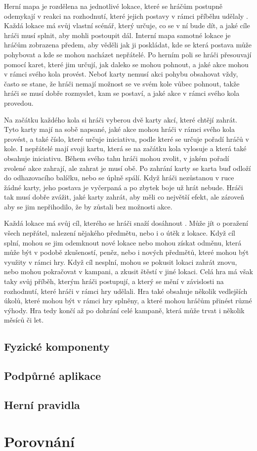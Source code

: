 Herní mapa je rozdělena na jednotlivé lokace, které se hráčům postupně odemykají v reakci na rozhodnutí, které jejich postavy v rámci příběhu udělaly . Každá lokace má svůj vlastní scénář, který určuje, co se v ní bude dít, a jaké cíle hráči musí splnit, aby mohli postoupit dál. Interní mapa samotné lokace je hráčům zobrazena předem, aby věděli jak ji poskládat, kde se která postava může pohybovat a kde se mohou nacházet nepřátelé. Po herním poli se hráči přesouvají pomocí karet, které jim určují, jak daleko se mohou pohnout, a jaké akce mohou v rámci svého kola provést. Neboť karty nemusí akci pohybu obsahovat vždy, často se stane, že hráči nemají možnost se ve svém kole vůbec pohnout, takže hráči se musí dobře rozmyslet, kam se postaví, a jaké akce v rámci svého kola provedou.

Na začátku každého kola si hráči vyberou dvě karty akcí, které chtějí zahrát. Tyto karty mají na sobě napsané, jaké akce mohou hráči v rámci svého kola provést, a také číslo, které určuje iniciativu, podle které se určuje pořadí hráčů v kole. I nepřátelé mají svoji kartu, která se na začátku kola vylosuje a která také obsahuje iniciativu. Během svého tahu hráči mohou zvolit, v jakém pořadí zvolené akce zahrají, ale zahrat je musí obě. Po zahrání karty se karta buď odloží do odhazovacího balíčku, nebo se úplně spálí. Když hráči nezůstanou v ruce žádné karty, jeho postava je vyčerpaná a po zbytek boje už hrát nebude. Hráči tak musí dobře zvážit, jaké karty zahrát, aby měli co největší efekt, ale zároveň aby se jim nepřihodilo, že by zůstali bez možnosti akce.

Každá lokace má svůj cíl, kterého se hráči snaží dosáhnout . Může jít o poražení všech nepřátel, nalezení nějakého předmětu, nebo i o útěk z lokace. Když cíl splní, mohou se jim odemknout nové lokace nebo mohou získat odměnu, která může být v podobě zkušeností, peněz, nebo i nových předmětů, které mohou být využity v rámci hry. Když cíl nesplní, mohou se pokusit lokaci zahrát znovu, nebo mohou pokračovat v kampani, a zkusit štěstí v jiné lokaci. Celá hra má však taky svůj příběh, kterým hráči postupují, a který se mění v závislosti na rozhodnutí, které hráči v rámci hry udělali. Hra také obsahuje několik vedlejších úkolů, které mohou být v rámci hry splněny, a které mohou hráčům přinést různé výhody. Hra tedy končí až po dohrání celé kampaně, která může trvat i několik měsíců či let.

\subsection{Fyzické komponenty}
\label{subsec:gh_components}

\subsection{Podpůrné aplikace}
\label{subsec:gh_apps}

\subsection{Herní pravidla}
\label{subsec:gh_rules}



\section{Porovnání}
\label{sec:comparison}